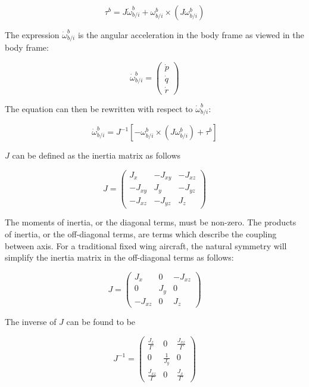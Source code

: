 \begin{equation}
\tau^b=J\dot{\omega}_{b/i}^b+\omega_{b/i}^b\times\left(J\omega_{b/i}^b\right)
\end{equation}

The expression $\dot{\omega}_{b/i}^b$ is the angular acceleration in the body frame as viewed in the body frame:

\begin{equation}
\dot{\omega}_{b/i}^b=
\begin{pmatrix}
\dot{p}\\
\dot{q}\\
\dot{r}
\end{pmatrix}
\end{equation}

The equation can then be rewritten with respect to $\dot{\omega}_{b/i}^b$:

\begin{equation}
\dot{\omega}_{b/i}^b=J^{-1}\left[-\omega_{b/i}^b\times\left(J\omega_{b/i}^b\right)+\tau^b\right]
\end{equation}

$J$ can be defined as the inertia matrix as follows

\begin{equation}
J=
	\begin{pmatrix}
	J_x & -J_{xy} & -J_{xz}\\
	-J_{xy} & J_y & -J_{yz}\\
	-J_{xz} & -J_{yz} & J_z
	\end{pmatrix}
\end{equation}

The moments of inertia, or the diagonal terms, must be non-zero.  The products of inertia, or the off-diagonal terms, are terms which describe the coupling between axis.  For a traditional fixed wing aircraft, the natural symmetry will simplify the inertia matrix in the off-diagonal terms as follows:

\begin{equation}
J=
	\begin{pmatrix}
	J_x & 0 & -J_{xz}\\
	0 & J_y & 0\\
	-J_{xz} & 0 & J_z
	\end{pmatrix}
\end{equation}

The inverse of $J$ can be found to be

\begin{equation}
J^{-1}=
	\begin{pmatrix}
	\frac{J_z}{\Gamma} & 0 & \frac{J_{xz}}{\Gamma}\\
	0 & \frac{1}{J_y} & 0\\
	\frac{J_{xz}}{\Gamma} & 0 & \frac{J_x}{\Gamma}
	\end{pmatrix}
\end{equation}

